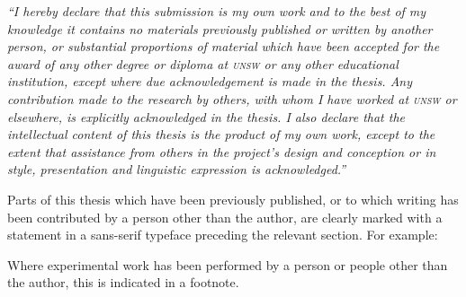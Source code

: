 \begin{center}
\begin{minipage}{0.6\textwidth}
\bigskip
\bigskip
\bigskip
\bigskip
\bigskip
\bigskip
  \textit{
    ``I hereby declare that this submission is my own work and to the best of my knowledge it contains no materials previously published or written by another person, or substantial proportions of material which have been accepted for the award of any other degree or diploma at \textsc{unsw} or any other educational institution, except where due acknowledgement is made in the thesis. 
    Any contribution made to the research by others, with whom I have worked at \textsc{unsw} or elsewhere, is explicitly acknowledged in the thesis. 
    I also declare that the intellectual content of this thesis is the product of my own work, except to the extent that assistance from others in the project's design and conception or in style, presentation and linguistic expression is acknowledged.''
  }
\end{minipage}
\end{center}
\bigskip
\bigskip
\bigskip
\bigskip
\bigskip

Parts of this thesis which have been previously published, or to which writing has been contributed by a person other than the author, are clearly marked with a statement in a sans-serif typeface preceding the relevant section. For example:

\smallskip
\bigskip


\smallskip
\bigskip

Where experimental work has been performed by a person or people other than the author, this is indicated in a footnote.
